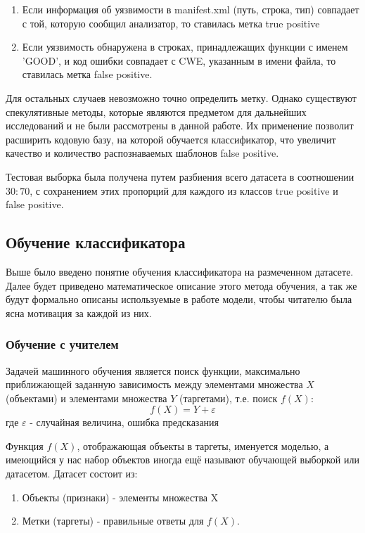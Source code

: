 \begin{enumerate}
    \item Если информация об уязвимости в manifest.xml (путь, строка, тип) совпадает с той, которую сообщил анализатор, то ставилась метка true positive
    \item Если уязвимость обнаружена в строках, принадлежащих функции с именем 'GOOD', и код ошибки совпадает с CWE, указанным в имени файла, то ставилась метка false positive.
\end{enumerate}

Для остальных случаев невозможно точно определить метку. Однако существуют спекулятивные методы, которые являются предметом для дальнейших исследований и не были рассмотрены в данной работе. Их применение позволит расширить кодовую базу, на которой обучается классификатор, что увеличит качество и количество распознаваемых шаблонов false positive.

Тестовая выборка была получена путем разбиения всего датасета в соотношении $30:70$, с сохранением этих пропорций для каждого из классов true positive и false positive.

\subsection{Обучение классификатора}

Выше было введено понятие обучения классификатора на размеченном датасете. Далее будет приведено математическое описание этого метода обучения, а так же будут формально описаны используемые в работе модели, чтобы читателю была ясна мотивация за каждой из них.

\subsubsection{Обучение с учителем}

Задачей машинного обучения является поиск функции, максимально приближающей заданную зависимость между элементами множества $X$ (объектами) и элементами множества $Y$ (таргетами), т.е. поиск $f(X):$
\[f(X) = Y + \varepsilon\]
где $\varepsilon$ - случайная величина, ошибка предсказания

Функция $f(X)$, отображающая объекты в таргеты, именуется моделью, а имеющийся у нас набор объектов иногда ещё называют обучающей выборкой или датасетом. Датасет состоит из:

\begin{enumerate}
    \item Объекты (признаки) - элементы множества X
    \item Метки (таргеты) - правильные ответы для $f(X)$.
\end{enumerate}

